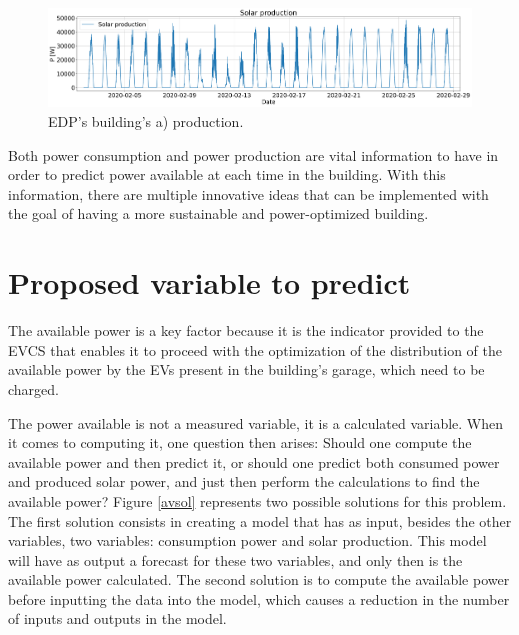 \begin{figure}[h!]
    \centering
    \begin{center}
    \includegraphics[width=1\textwidth]{Images/power_production.png}
    \caption{EDP's building's a) production.}
    \label{production}
    \end{center}
\end{figure}


Both power consumption and power production are vital information to have in order to predict power available at each time in the building. With this information, there are multiple innovative ideas that can be implemented with the goal of having a more sustainable and power-optimized building.

\section{Proposed variable to predict}\label{chap3:sec:variable_to_predict}

The available power is a key factor because it is the indicator provided to the \ac{EVCS} that enables it to proceed with the optimization of the distribution of the available power by the \ac{EV}s present in the building's garage, which need to be charged.

The power available is not a measured variable, it is a calculated variable. When it comes to computing it, one question then arises: Should one compute the available power and then predict it, or should one predict both consumed power and produced solar power, and just then perform the calculations to find the available power? Figure \ref{avsol} represents two possible solutions for this problem. The first solution consists in creating a model that has as input, besides the other variables, two variables: consumption power and solar production. This model will have as output a forecast for these two variables, and only then is the available power calculated. The second solution is to compute the available power before inputting the data into the model, which causes a reduction in the number of inputs and outputs in the model. 

